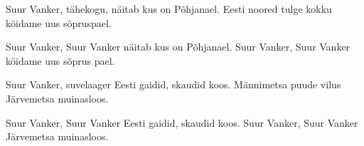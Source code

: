Suur Vanker, t\"ahekogu,
n\"aitab kus on P\~ohjanael.
Eesti noored tulge kokku
k\"oidame uus s\~opruspael.

Suur Vanker, Suur Vanker
n\"aitab kus on P\~ohjanael.
Suur Vanker, Suur Vanker
k\"oidame uus s\~oprus pael.

Suur Vanker, suvelaager
Eesti gaidid, skaudid koos. 
M\"annimetsa puude vilus
J\"arvemetsa muinasloos.

Suur Vanker, Suur Vanker
Eesti gaidid, skaudid koos.
Suur Vanker, Suur Vanker
J\"arvemetsa muinasloos.
